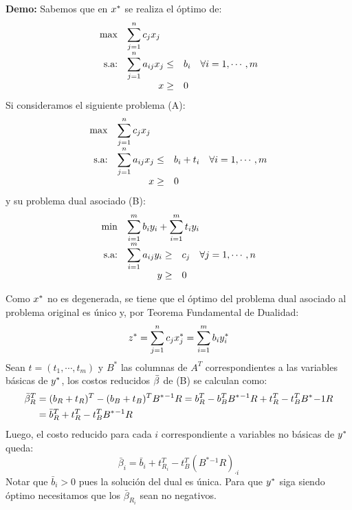 \documentclass[10pt, aspectratio=169]{beamer}
\begin{document}
\begin{frame}{}\fontsize{9pt}{2pt}\selectfont
    \textbf{Demo:} Sabemos que en $x^{\ast}$ se realiza el óptimo de:
    \[\begin{array}{rrl}
        \max & \multicolumn{2}{l}{\displaystyle \sum_{j=1}^n c_jx_j} \\
        \text{s.a:} & \displaystyle \sum_{j=1}^n a_{ij}x_j \leq& b_i\quad \forall i=1,\cdots,m \\
         & x \geq& 0
    \end{array}
    \]
    Si consideramos el siguiente problema (A):
        \[\begin{array}{rrl}
        \max & \multicolumn{2}{l}{\displaystyle \sum_{j=1}^n c_jx_j} \\
        \text{s.a:} & \displaystyle \sum_{j=1}^n a_{ij}x_j \leq& b_i+t_i \quad \forall i=1,\cdots,m \\
         & x \geq& 0
    \end{array}
    \]
    y su problema dual asociado (B):
        \[\begin{array}{rrl}
        \min & \multicolumn{2}{l}{\displaystyle \sum_{i=1}^m b_iy_i + \sum_{i=1}^m t_iy_i} \\
        \text{s.a:} & \displaystyle \sum_{i=1}^m a_{ij}y_i \geq& c_j \quad \forall j=1,\cdots,n \\
         & y \geq& 0
    \end{array}
    \]
\end{frame}

\begin{frame}{}
    
    \fontsize{9pt}{2pt}\selectfont
    Como $x^{\ast}$ no es degenerada, se tiene que el óptimo del problema dual asociado al problema original  es único y, por Teorema Fundamental de Dualidad: \[z^{\ast}=\displaystyle\sum_{j=1}^n c_jx^{\ast}_j=\sum_{i=1}^m b_iy^{\ast}_i\]
    Sean $t=(t_1,\cdots,t_m)$ y $B^{\ast}$ las columnas de $A^T$ correspondientes a las variables básicas de $y^{\ast}$, los costos reducidos $\Bar{\beta}$ de (B) se calculan como:
    \begin{align*}
    \Bar{\beta}_R^T & =  (b_R+t_R)^T - (b_B+t_B)^TB^{\ast}{}^{-1}R  = b_R^T-b_B^TB^{\ast}{}^{-1}R + t_R^T - t_B^TB^{\ast}{}^{}{-1}R \\
     & = \Bar{b}_R^T + t_R^T - t_B^TB^{\ast}{}^{-1}R
    \end{align*}
    Luego, el costo reducido para cada $i$ correspondiente a variables no básicas de $y^{\ast}$ queda:
    \[ \bar{\beta}_i = \bar{b}_i + t_{R_i}^T - t_B^T(B^{\ast}{}^{-1}R)_{\cdot i}\]
    Notar que $\bar{b}_i>0$ pues la solución %
    del dual es única. Para que $y^{\ast}$ siga siendo óptimo necesitamos que los $\bar{\beta}_{R_i}$ sean no negativos.
\end{frame}
\end{document}
